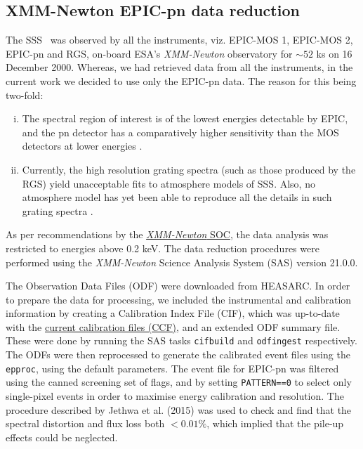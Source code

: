     \subsection{XMM-Newton EPIC-pn data reduction}
    	The SSS \source\ was observed by all the instruments, viz. EPIC-MOS 1, EPIC-MOS 2, EPIC-pn and RGS, on-board ESA's \textit{XMM-Newton} observatory for $\sim 52$ ks on 16 December 2000. Whereas, we had retrieved data from all the instruments, in the current work we decided to use only the EPIC-pn data. The reason for this being two-fold:
    	\begin{enumerate}[i.]
    		\item The spectral region of interest is of the lowest energies detectable by EPIC, and the pn detector has a comparatively higher sensitivity than the MOS detectors at lower energies \cite{stecchini2023revisiting,mateos2009statistical}.
    		\item Currently, the high resolution grating spectra (such as those produced by the RGS) yield unacceptable fits to atmosphere models of SSS. Also, no atmosphere model has yet been able to reproduce all the details in such grating spectra \cite{ness2020complications}.
    	\end{enumerate}
    	As per recommendations by the %
    	\href{https://xmmweb.esac.esa.int/docs/documents/CAL-TN-0018.pdf}{\textit{XMM-Newton} SOC}, the data analysis was restricted to energies above 0.2 keV. The data reduction procedures were performed using the \textit{XMM-Newton} Science Analysis System (SAS) version 21.0.0.
    
    	The Observation Data Files (ODF) were downloaded from HEASARC. In order to prepare the data for processing, we included the instrumental and calibration information by creating a Calibration Index File (CIF), which was up-to-date with the %
    	\href{https://www.cosmos.esa.int/web/xmm-newton/current-calibration-files}{current calibration files (CCF)}, and an extended ODF summary file. These were done by running the SAS tasks \texttt{cifbuild} and \texttt{odfingest} respectively. The ODFs were then reprocessed to generate the calibrated event files using the \texttt{epproc}, using the default parameters. The event file for EPIC-pn was filtered using the canned screening set of flags, and by setting \texttt{PATTERN==0} to select only single-pixel events in order to maximise energy calibration and resolution. The procedure described by Jethwa et al. (2015) \cite{jethwa2015pile} was used to check and find that the spectral distortion and flux loss both $<0.01\%$, which implied that the pile-up effects could be neglected.
    

